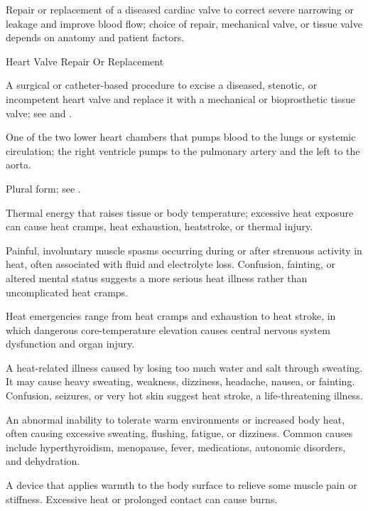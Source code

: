  Repair or replacement of a diseased cardiac valve to correct severe narrowing or leakage and improve blood flow; choice of repair, mechanical valve, or tissue valve depends on anatomy and patient factors.

\synonyms
Heart Valve Repair Or Replacement

 A surgical or catheter-based procedure to excise a diseased, stenotic, or incompetent heart valve and replace it with a mechanical or bioprosthetic tissue valve; see  and .

 One of the two lower heart chambers that pumps blood to the lungs or systemic circulation; the right ventricle pumps to the pulmonary artery and the left to the aorta.

 Plural form; see .

 Thermal energy that raises tissue or body temperature; excessive heat exposure can cause heat cramps, heat exhaustion, heatstroke, or thermal injury.

 Painful, involuntary muscle spasms occurring during or after strenuous activity in heat, often associated with fluid and electrolyte loss. Confusion, fainting, or altered mental status suggests a more serious heat illness rather than uncomplicated heat cramps.

 Heat emergencies range from heat cramps and exhaustion to heat stroke, in which dangerous core-temperature elevation causes central nervous system dysfunction and organ injury.

 A heat-related illness caused by losing too much water and salt through sweating. It may cause heavy sweating, weakness, dizziness, headache, nausea, or fainting. Confusion, seizures, or very hot skin suggest heat stroke, a life-threatening illness.

 An abnormal inability to tolerate warm environments or increased body heat, often
causing excessive sweating, flushing, fatigue, or dizziness. Common causes include
hyperthyroidism, menopause, fever, medications, autonomic disorders, and dehydration.

 A device that applies warmth to the body surface to relieve some muscle pain or stiffness. Excessive heat or prolonged contact can cause burns.

